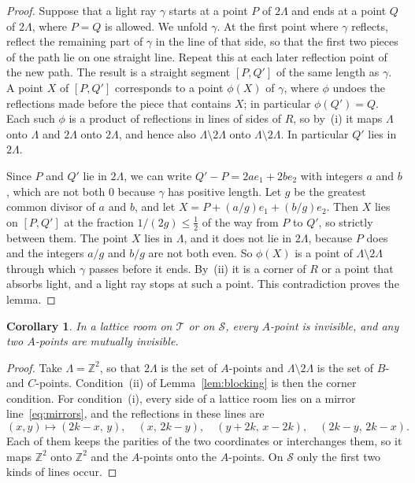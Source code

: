 \documentclass[11pt,a4paper]{article}
\theoremstyle{plain}
\newtheorem{corollary}[theorem]{Corollary}
\theoremstyle{definition}
\theoremstyle{remark}
\newcommand{\Z}{\mathbb{Z}}
\newcommand{\T}{\mathcal{T}}
\newcommand{\Sq}{\mathcal{S}}
\numberwithin{equation}{section}
\begin{document}
\begin{proof}
Suppose that a light ray $\gamma$ starts at a point $P$ of $2\Lambda$ and ends at a point $Q$ of $2\Lambda$, where $P=Q$ is allowed. We unfold $\gamma$. At the first point where $\gamma$ reflects, reflect the remaining part of $\gamma$ in the line of that side, so that the first two pieces of the path lie on one straight line. Repeat this at each later reflection point of the new path. The result is a straight segment $[P,Q']$ of the same length as $\gamma$. A point $X$ of $[P,Q']$ corresponds to a point $\phi(X)$ of $\gamma$, where $\phi$ undoes the reflections made before the piece that contains $X$; in particular $\phi(Q')=Q$. Each such $\phi$ is a product of reflections in lines of sides of $R$, so by~(i) it maps $\Lambda$ onto $\Lambda$ and $2\Lambda$ onto $2\Lambda$, and hence also $\Lambda\setminus2\Lambda$ onto $\Lambda\setminus2\Lambda$. In particular $Q'$ lies in $2\Lambda$.

Since $P$ and $Q'$ lie in $2\Lambda$, we can write $Q'-P=2ae_1+2be_2$ with integers $a$ and $b$, which are not both $0$ because $\gamma$ has positive length. Let $g$ be the greatest common divisor of $a$ and $b$, and let $X=P+(a/g)e_1+(b/g)e_2$. Then $X$ lies on $[P,Q']$ at the fraction $1/(2g)\le\frac12$ of the way from $P$ to $Q'$, so strictly between them. The point $X$ lies in $\Lambda$, and it does not lie in $2\Lambda$, because $P$ does and the integers $a/g$ and $b/g$ are not both even. So $\phi(X)$ is a point of $\Lambda\setminus2\Lambda$ through which $\gamma$ passes before it ends. By~(ii) it is a corner of $R$ or a point that absorbs light, and a light ray stops at such a point. This contradiction proves the lemma.
\end{proof}

\begin{corollary}\label{cor:blocking}
In a lattice room on $\T$ or on $\Sq$, every $A$-point is invisible, and any two $A$-points are mutually invisible.
\end{corollary}

\begin{proof}
Take $\Lambda=\Z^2$, so that $2\Lambda$ is the set of $A$-points and $\Lambda\setminus2\Lambda$ is the set of $B$- and $C$-points. Condition~(ii) of Lemma~\ref{lem:blocking} is then the corner condition. For condition~(i), every side of a lattice room lies on a mirror line~\eqref{eq:mirrors}, and the reflections in these lines are
\[
(x,y)\mapsto(2k-x,\,y),\quad(x,\,2k-y),\quad(y+2k,\,x-2k),\quad(2k-y,\,2k-x).
\]
Each of them keeps the parities of the two coordinates or interchanges them, so it maps $\Z^2$ onto $\Z^2$ and the $A$-points onto the $A$-points. On $\Sq$ only the first two kinds of lines occur.
\end{proof}
\end{document}
